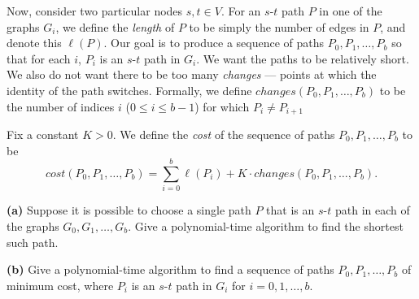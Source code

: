 \documentclass[12pt]{article}
\begin{document}
\begin{enumerate}
Now, consider two particular nodes $s, t \in V$. 
For an $s$-$t$ path $P$ in one of the graphs $G_i$, 
we define the {\em length} of $P$ to be simply the number 
of edges in $P$, and denote this $\ell(P)$. 
Our goal is to produce a sequence of paths  
$P_0, P_1, \ldots, P_b$ so that 
for each $i$, $P_i$ is an $s$-$t$ path in $G_i$. 
We want the paths to be relatively short. 
We also do not want there to be too many {\em changes} --- 
points at which the identity of the path switches. 
Formally, we define  
$changes(P_0, P_1, \ldots, P_b)$ to be the number of 
indices $i$ ($0 \leq i \leq b-1$) for which $P_i \neq P_{i+1}$ 
 
Fix a constant $K > 0$. 
We define the {\em cost} of the sequence of paths 
$P_0, P_1, \ldots, P_b$ to be 
$$cost(P_0, P_1, \ldots, P_b) =  
\sum_{i=0}^b \ell(P_i) + K \cdot changes(P_0, P_1, \ldots, P_b).$$ 

{\bf (a)} Suppose it is possible to choose a single path $P$
that is an $s$-$t$ path in each of the graphs $G_0, G_1, \ldots, G_b$.
Give a polynomial-time algorithm to find the shortest such path.

{\bf (b)} Give a polynomial-time algorithm to find a sequence of 
paths $P_0, P_1, \ldots, P_b$
of minimum cost, where $P_i$ is an $s$-$t$ path in $G_i$ 
for $i = 0, 1, \ldots, b$. 
 
 
\end{enumerate}
\end{document}
